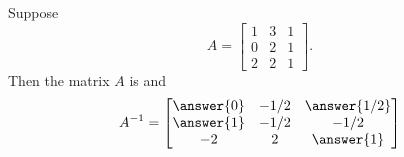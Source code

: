 \documentclass{ximera}
\begin{document}
\begin{exercise}
  Suppose
  \[
    A = \begin{bmatrix}  1 & 3 & 1 \\ 0 & 2 & 1 \\ 2 & 2 & 1\end{bmatrix}.
  \]
  Then the matrix $A$ is  and
  \[
    A^{-1} =  \begin{bmatrix} \answer{0} & -1/2 & \answer{1/2}\\ \answer{1} & -1/2 & -1/2 \\ -2 & 2 & \answer{1} \end{bmatrix}
  \]
\end{exercise}
\end{document}
